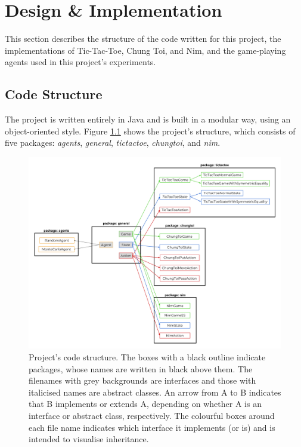 \documentclass[11pt,a4paper]{report}
\begin{document}
\chapter{Design \& Implementation}
\label{sec:DesignImpl}

This section describes the structure of the code written for this project, the implementations of Tic-Tac-Toe, Chung Toi, and Nim, and the game-playing agents used in this project's experiments.


\section{Code Structure}
\label{sec:code-structure}

The project is written entirely in Java and is built in a modular way, using an object-oriented style. Figure \ref{code-structure} shows the project's structure, which consists of five packages: \emph{agents}, \emph{general}, \emph{tictactoe}, \emph{chungtoi}, and \emph{nim}.

\begin{figure}[htbp]
	\begin{center}
		\includegraphics[width=\linewidth]{code_structure.png}
		\caption{Project's code structure. The boxes with a black outline indicate packages, whose names are written in black above them. The filenames with grey backgrounds are interfaces and those with italicised names are abstract classes. An arrow from A to B indicates that B implements or extends A, depending on whether A is an interface or abstract class, respectively. The colourful boxes around each file name indicates which interface it implements (or is) and is intended to visualise inheritance.}
		\label{code-structure}
	\end{center}
\end{figure}
\end{document}
